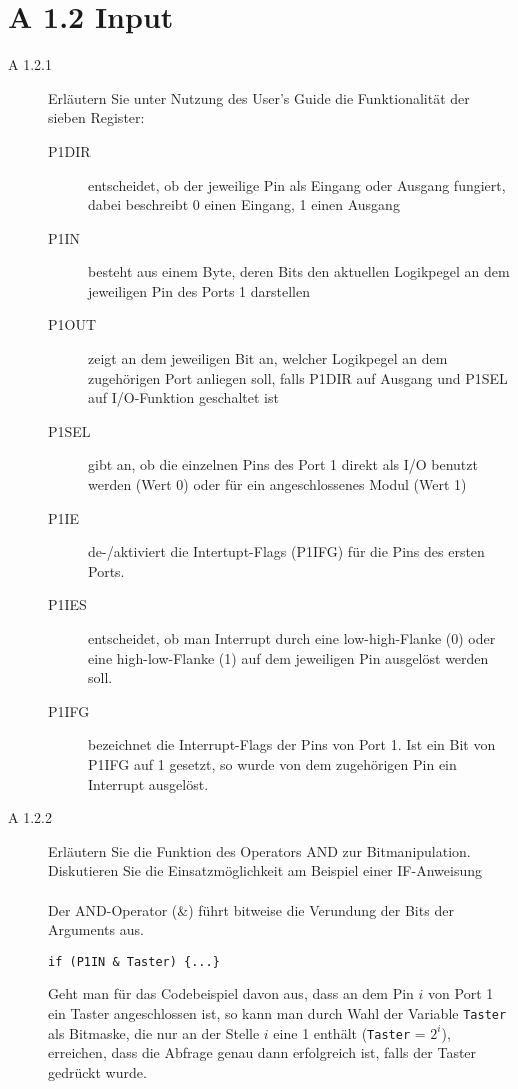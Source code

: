 \documentclass[11pt,a4paper,ngerman]{article}
\begin{document}
\section*{A 1.2	Input}

\begin{description}
	\item[A 1.2.1] Erläutern Sie unter Nutzung des User's Guide die Funktionalität der sieben Register:
	
	\begin{description}
		\item[P1DIR] entscheidet, ob der jeweilige Pin als Eingang oder Ausgang fungiert, dabei beschreibt 0 einen Eingang, 1 einen Ausgang
		\item[P1IN] besteht aus einem Byte, deren Bits den aktuellen Logikpegel an dem jeweiligen Pin des Ports 1 darstellen
		\item[P1OUT] zeigt an dem jeweiligen Bit an, welcher Logikpegel an dem zugehörigen Port anliegen soll, falls P1DIR auf Ausgang und P1SEL auf I/O-Funktion geschaltet ist
		\item[P1SEL] gibt an, ob die einzelnen Pins des Port 1 direkt als I/O benutzt werden (Wert 0) oder für ein angeschlossenes Modul (Wert 1)
		\item[P1IE] de-/aktiviert die Intertupt-Flags (P1IFG) für die Pins des ersten Ports.
		\item[P1IES] entscheidet, ob man Interrupt durch eine low-high-Flanke (0) oder eine high-low-Flanke (1) auf dem jeweiligen Pin ausgelöst werden soll.
		\item[P1IFG] bezeichnet die Interrupt-Flags der Pins von Port 1. Ist ein Bit von P1IFG auf 1 gesetzt, so wurde von dem zugehörigen Pin ein Interrupt ausgelöst.
	\end{description}
	
	\item[A 1.2.2] Erläutern Sie die Funktion des Operators AND zur Bitmanipulation. Diskutieren Sie die Einsatzmöglichkeit am Beispiel einer IF-Anweisung \\ \\
	
	Der AND-Operator (\&) führt bitweise die Verundung der Bits der Arguments aus.
	\begin{lstlisting}
if (P1IN & Taster) {...}
	\end{lstlisting}
	Geht man für das Codebeispiel davon aus, dass an dem Pin $i$ von Port 1 ein Taster angeschlossen ist, so kann man durch Wahl der Variable \texttt{Taster} als Bitmaske, die nur an der Stelle $i$ eine 1 enthält (\texttt{Taster} = $2^i$), erreichen, dass die Abfrage genau dann erfolgreich ist, falls der Taster gedrückt wurde.
	

\end{description}
\end{document}

